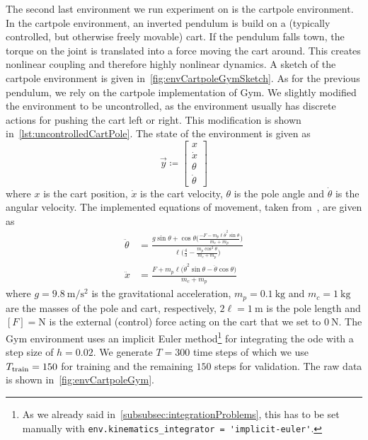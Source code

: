 			The second last environment we run experiment on is the cartpole environment. In the cartpole environment, an inverted pendulum is build on a (typically controlled, but otherwise freely movable) cart. If the pendulum falls town, the torque on the joint is translated into a force moving the cart around. This creates nonlinear coupling and therefore highly nonlinear dynamics. A sketch of the cartpole environment is given in~\autoref{fig:envCartpoleGymSketch}. As for the previous pendulum, we rely on the cartpole implementation of Gym. We slightly modified the environment to be uncontrolled, as the environment usually has discrete actions for pushing the cart left or right. This modification is shown in~\autoref{lst:uncontrolledCartPole}. The state of the environment is given as
			\begin{equation*}
				\vec{y} \coloneqq
					\begin{bmatrix}
						x \\
						\dot{x} \\
						\theta \\
						\dot{\theta}
					\end{bmatrix}
			\end{equation*}
			where \(x\) is the cart position, \(\dot{x}\) is the cart velocity, \(\theta\) is the pole angle and \(\dot{\theta}\) is the angular velocity. The implemented equations of movement, taken from~\cite{florianCorrectEquationsDynamics2005}, are given as
			\begin{align*}
				\ddot{\theta} &= \frac{g \sin\theta + \cos\theta \Big(\! \frac{-F - m_p \ell \dot{\theta}^2 \sin\theta}{m_c + m_p} \!\Big)}{\ell \Big(\! \frac{4}{3} - \frac{m_p \cos^2\theta}{m_c + m_p} \!\Big)} \\
				\ddot{x} &= \frac{F + m_p \ell \big( \dot{\theta}^2 \sin\theta - \ddot{\theta} \cos\theta \big)}{m_c + m_p}
			\end{align*}
			where \( g = \SI{9.8}{\meter\per\second\squared} \) is the gravitational acceleration, \( m_p = \SI{0.1}{\kilogram} \) and \( m_c = \SI{1}{\kilogram} \) are the masses of the pole and cart, respectively, \( 2\ell = \SI{1}{\meter} \) is the pole length and \( [F] = \si{\newton} \) is the external (control) force acting on the cart that we set to \( \SI{0}{\newton} \). The Gym environment uses an implicit Euler method\footnote{As we already said in~\autoref{subsubsec:integrationProblems}, this has to be set manually with \lstinline|env.kinematics_integrator = 'implicit-euler'|.} for integrating the \ac{ode} with a step size of \( h = 0.02 \). We generate \( T = 300 \) time steps of which we use \( T_{\mathrm{train}} = 150 \) for training and the remaining \(150\) steps for validation. The raw data is shown in~\autoref{fig:envCartpoleGym}.

